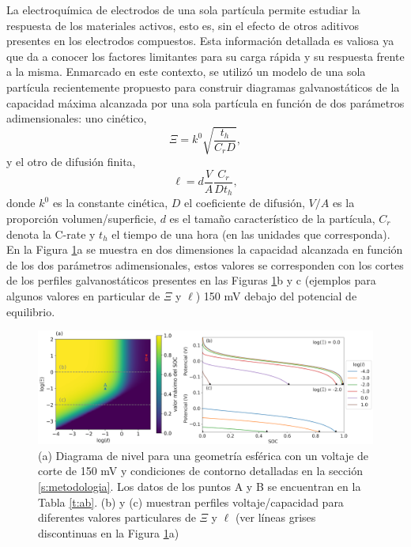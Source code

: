 La electroquímica de electrodos de una sola partícula \cite{ventosa2021, 
heubner2020, takahashi2020, wahab2020, xu2020, tao2019, fukui2011} permite 
estudiar la respuesta  de los materiales activos, esto es, sin el efecto 
de otros aditivos presentes en los electrodos compuestos. Esta información 
detallada es valiosa ya que da a conocer los factores limitantes para su 
carga rápida y su respuesta frente a la misma. Enmarcado en este contexto, se utilizó un 
modelo de una sola partícula recientemente propuesto \cite{gavilan2023} 
para construir diagramas galvanostáticos de la capacidad máxima 
alcanzada por una sola partícula en función de dos parámetros adimensionales: uno
cinético,
\begin{equation}\label{eq:xi}
    \Xi = k^0 \sqrt{\frac{t_h}{C_r D}},
\end{equation}
y el otro de difusión finita,
\begin{equation}\label{eq:ele}
    \ell = d \frac{V}{A} \frac{C_r}{D t_h},
\end{equation}
donde $k^0$ es la constante cinética, $D$ el coeficiente de difusión, $V/A$ es la 
proporción volumen/superficie, $d$ es el tamaño característico de la partícula, 
$C_r$ denota la C-rate y $t_h$ el tiempo de una hora (en las unidades que
corresponda). En la Figura \ref{fig:diagnostico}a se muestra en dos dimensiones la 
capacidad alcanzada en función de los dos parámetros adimensionales, estos valores 
se corresponden con los cortes de los perfiles galvanostáticos presentes en las
Figuras \ref{fig:diagnostico}b y c (ejemplos para algunos valores en particular 
de $\Xi$ y $\ell$) 150 mV debajo del potencial de equilibrio.

\begin{figure}[h!]
    \centering
    \includegraphics[width=\textwidth]{FastCharging/un/introduccion/diagnosis-merged.png}
    \caption{(a) Diagrama de nivel para una geometría esférica con un voltaje de 
    corte de 150 mV y condiciones de contorno detalladas en la sección 
    \ref{s:metodologia}. Los datos de los puntos A y B se encuentran en la 
    Tabla \ref{t:ab}. (b) y (c) muestran perfiles voltaje/capacidad para 
    diferentes valores particulares de $\Xi$ y $\ell$ (ver líneas grises 
    discontinuas en la Figura \ref{fig:diagnostico}a)}
    \label{fig:diagnostico}
\end{figure}


